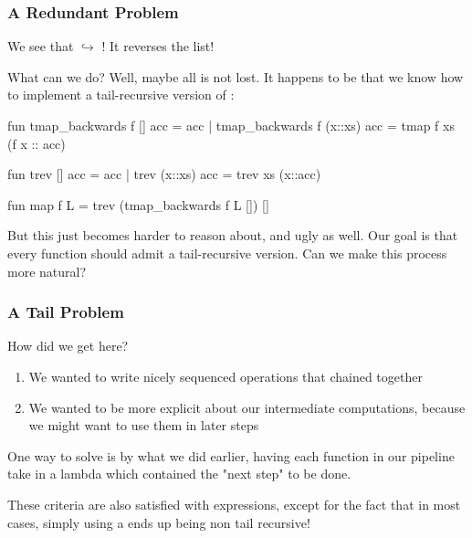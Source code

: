 \documentclass[aspectratio=169, handout]{beamer}
\begin{document}
\begin{frame}[fragile]
  \frametitle{A Redundant Problem}

  We see that  $\hookrightarrow$ 
  \code{["3", "2", "1"]}! It reverses the list!

  \pause
  \vspace{\fill}

  What can we do? Well, maybe all is not lost. It happens to be that 
  we know how to implement a tail-recursive version of :

  {\small
  \begin{codeblock}
    fun tmap_backwards f [] acc = acc
      | tmap_backwards f (x::xs) acc = tmap f xs (f x :: acc) 

    fun trev [] acc = acc
      | trev (x::xs) acc = trev xs (x::acc)

    fun map f L = trev (tmap_backwards f L []) []
  \end{codeblock}
  }

  \pause
  \vspace{\fill}

  But this just becomes harder to reason about, and ugly as well. Our goal
  is that every function should admit a tail-recursive version. Can we
  make this process more natural?
\end{frame}

\begin{frame}[fragile]
  \frametitle{A Tail Problem}

  How did we get here?

  \pause
  \vspace{\fill}

  \begin{enumerate}
    \item We wanted to write nicely sequenced operations that chained together
    \item We wanted to be more explicit about our intermediate computations, because
    we might want to use them in later steps
  \end{enumerate}

  \pause
  \vspace{\fill}

  One way to solve is by what we did earlier, having each function in our pipeline 
  take in a lambda which contained the "next step" to be done.

  \pause
  \vspace{\fill}

  These criteria are also satisfied with  expressions, except for the  
  fact that in most cases, simply using a  ends up being non
  tail recursive!

  \pause
  \vspace{\fill}

\end{frame}
\end{document}
